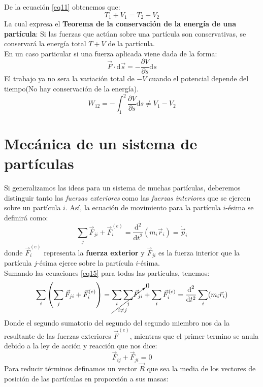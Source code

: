 \documentclass[../main]{subfiles}
\begin{document}
De la ecuación \eqref{eq11}  obtenemos que:
    \begin{equation}
        T_1+V_1=T_2+V_2
        \label{eq12}
    \end{equation}
La cual expresa el \textbf{Teorema de la conservación de la energía de una partícula}: Si las fuerzas que actúan sobre una partícula son conservativas, se conservará la energía total $T+V$ de la partícula. \\
    \vspace{0.2cm}
    En un caso particular si una fuerza aplicada viene dada de la forma:
    \begin{equation}
        \vec{F}\cdot \text{d}\vec{s}=-\dfrac{\partial V}{\partial s} \text{d}s
        \label{eq13}
    \end{equation}
El trabajo ya no sera la variación total de $-V$ cuando el potencial depende del tiempo(No hay conservación de la energía).
    \begin{equation}
        W_{12}=-\int_1^2 \dfrac{\partial V}{\partial s}\text{d}s \neq V_1-V_2
        \label{eq14}
    \end{equation}

\section{Mecánica de un sistema de partículas}
Si generalizamos las ideas para un sistema de muchas partículas, deberemos distinguir tanto las \textit{fuerzas exteriores} como las \textit{fuerzas interiores} que se ejercen sobre un partícula $i$. Así, la ecuación de movimiento para la partícula $i$-ésima se definirá como:
    \begin{equation}
        \sum_j \vec{F}_{ji}+\vec{F}_i^{(e)}=\dfrac{\text{d}^2}{\text{d}t^2}(m_i \vec{r}_i)=\dot{\vec{p}}_i
        \label{eq15}
    \end{equation}
donde $\vec{F}_i^{(e)}$ representa la \textbf{fuerza exterior} y $\vec{F}_{ji}$ es la \textsf{fuerza interior} que la partícula $j$-ésima ejerce sobre la partícula $i$-ésima. \\
    \vspace{0.2cm}
Sumando las ecuaciones \eqref{eq15} para todas las partículas, tenemos:
    \begin{equation}
        \sum_i\left(\sum_j \vec{F}_{ji}+\vec{F}_i^{(e)} \right)= \cancelto{0}{\underset{i \neq j}{\sum_i \sum_j} \vec{F}_{ji}} +\sum_i \vec{F}_i^{(e)}=\dfrac{\text{d}^2}{\text{d}t^2}  \sum_i (m_i \vec{r}_i) 
        \label{eq16}
    \end{equation}
Donde el segundo sumatorio del segundo del segundo miembro nos da la resultante de las fuerzas exteriores $\vec{F}^{(e)}$, mientras que el primer termino se anula debido a la ley de acción y reacción que nos dice:
    \begin{equation}
        \vec{F}_{ij}+\vec{F}_{ji}=0
        \label{eq17}
    \end{equation}
Para reducir términos definamos un vector $\vec{R}$ que sea la media de los vectores de posición de las partículas en proporción a sus masas:
    
\end{document}
